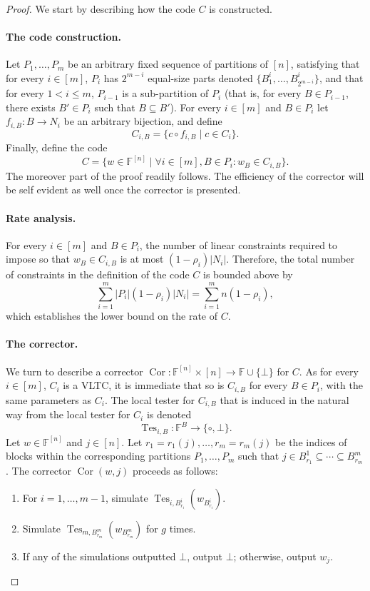 \documentclass[10pt,a4paper]{article}
\begin{document}
\begin{proof}
We start by describing how the code $C$ is constructed.
\paragraph{The code construction.} Let $P_1,\ldots,P_m$ be an arbitrary fixed sequence of partitions of $[n]$, satisfying that for every $i\in[m]$, $P_i$ has $2^{m-i}$ equal-size parts denoted $\{B_1^i,\ldots,B_{2^{m-i}}^i\}$, and that for every $1<i\le m$, $P_{i-1}$ is a sub-partition of $P_i$ (that is, for every $B\in P_{i-1}$, there exists $B'\in P_i$ such that $B\subseteq B'$). For every $i\in[m]$ and $B\in P_i$ let $f_{i,B}:B\to N_i$ be an arbitrary bijection, and define
\[C_{i,B}=\{c\circ f_{i,B}\mid c\in C_i\}.\]
Finally, define the code
\[C=\{w\in\mathbb F^{[n]}\mid\forall i\in[m],B\in P_i:w_B\in C_{i,B}\}.\]
The moreover part of the proof readily follows. The efficiency of the corrector will be self evident as well once the corrector is presented.
\paragraph{Rate analysis.} For every $i\in[m]$ and $B\in P_i$, the number of linear constraints required to impose so that $w_B\in C_{i,B}$ is at most $(1-\rho_i)|N_i|$. Therefore, the total number of constraints in the definition of the code $C$ is bounded above by
\[\sum_{i=1}^m|P_i|(1-\rho_i)|N_i|=\sum_{i=1}^m n(1-\rho_i),\]
which establishes the lower bound on the rate of $C$.
\paragraph{The corrector.} We turn to describe a corrector $\operatorname{Cor}:\mathbb F^{[n]}\times[n]\to\mathbb F\cup\{\bot\}$ for $C$. As for every $i\in[m]$, $C_i$ is a VLTC, it is immediate that so is $C_{i,B}$ for every $B\in P_i$, with the same parameters as $C_i$. The local tester for $C_{i,B}$ that is induced in the natural way from the local tester for $C_i$ is denoted
\[\operatorname{Tes}_{i,B}:\mathbb F^B\to\{\circ,\bot\}.\]
Let $w\in\mathbb F^{[n]}$ and $j\in[n]$. Let $r_1=r_1(j),\ldots,r_m=r_m(j)$ be the indices of blocks within the corresponding partitions $P_1,\ldots,P_m$ such that $j\in B_{r_1}^1\subseteq\cdots\subseteq B_{r_m}^m$. The corrector $\operatorname{Cor}(w,j)$ proceeds as follows:
\begin{enumerate}\item For $i=1,\ldots,m-1$, simulate $\operatorname{Tes}_{i,B_{r_i}^i}(w_{B_{r_i}^i})$.\item Simulate $\operatorname{Tes}_{m,B_{r_m}^m}(w_{B_{r_m}^m})$ for $g$ times.\item If any of the simulations outputted $\bot$, output $\bot$; otherwise, output $w_j$.\end{enumerate}

\end{proof}
\end{document}
